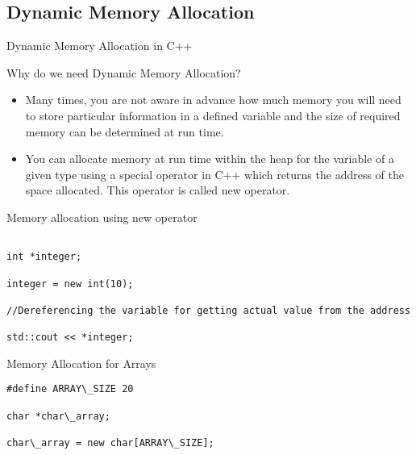 \documentclass[newPxFont]{beamer}
\begin{document}
\subsection{Dynamic Memory Allocation}

\begin{frame}[allowframebreaks]{Dynamic Memory Allocation in C++}

\begin{exampleblock}{Why do we need Dynamic Memory Allocation?}

\begin{itemize}
\item Many times, you are not aware in advance how much memory you will need to store particular information in a defined variable and the size of required memory can be determined at run time.

\item You can allocate memory at run time within the heap for the variable of a given type using a special operator in C++ which returns the address of the space allocated. This operator is called \alert{new} operator.
    
\end{itemize}


\end{exampleblock}

\vspace{1em}

Memory allocation using \alert{new} operator 

\begin{verbatim}

int *integer;

integer = new int(10);

//Dereferencing the variable for getting actual value from the address

std::cout << *integer;

\end{verbatim}
Memory Allocation for \alert{Arrays}

\begin{verbatim}
#define ARRAY\_SIZE 20

char *char\_array;

char\_array = new char[ARRAY\_SIZE];

\end{verbatim}

\end{frame}
\end{document}
